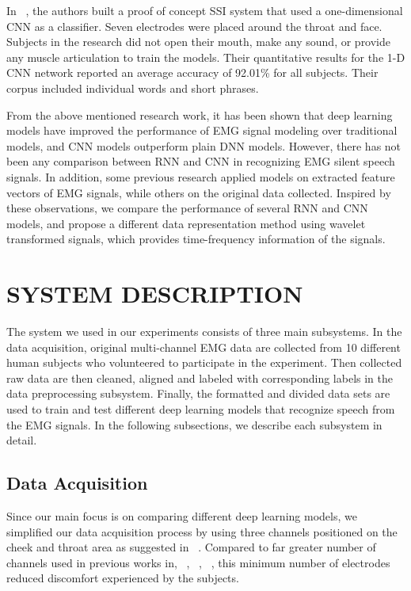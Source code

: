 \documentclass{article}
\begin{document}
In ~\cite{kapur_alterego:_2018}, the authors built a proof of concept SSI system that used a one-dimensional CNN as a classifier. Seven electrodes were placed around the throat and face.  Subjects in the research did not open their mouth, make any sound, or provide any muscle articulation to train the models. Their quantitative results for the 1-D CNN network reported an average accuracy of 92.01\% for all subjects. Their corpus included individual words and short phrases.

From the above mentioned research work, it has been shown that deep learning models have improved the performance of EMG signal modeling over traditional models, and CNN models outperform plain DNN models. However, there has not been any comparison between RNN and CNN in recognizing EMG silent speech signals. In addition, some previous research  applied models on extracted feature vectors of EMG signals, while others on the original data collected. Inspired by these observations, we compare the performance of several RNN and CNN models, and propose a different data representation method using wavelet transformed signals, which provides time-frequency information of the signals.  

\section{SYSTEM DESCRIPTION}
\label{sec:SYSTEM DESCRIPTION}

The system we used in our experiments consists of three main subsystems. In the data acquisition, original multi-channel  EMG data are collected from 10 different human subjects who volunteered to participate in the experiment. Then collected raw data are then cleaned, aligned and labeled with corresponding labels in the data preprocessing subsystem. Finally, the formatted and divided data sets are used to train and test different deep learning models that recognize speech from the EMG signals. In the following subsections, we describe each subsystem in detail. 

\subsection{Data Acquisition}
\label{ssec:Capturing Data}
Since our main focus is on comparing different deep learning models, we simplified our data acquisition process by using three channels positioned on the cheek and throat area as suggested in ~\cite{maier-hein_session_2005}. Compared to far greater number of channels used in previous works in\cite{kapur_alterego:_2018}, ~\cite{wand_pattern_2014}, ~\cite{janke_emg--speech:_2017}, ~\cite{maier-hein_session_2005}, this minimum number of electrodes reduced discomfort experienced by the subjects. 
\end{document}
